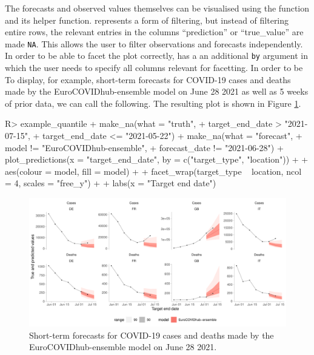 \documentclass[
]{jss}
\begin{document}
The forecasts and observed values themselves can be visualised using the
 function and its  helper
function.  represents a form of filtering, but instead
of filtering entire rows, the relevant entries in the columns
``prediction'' or ``true\_value'' are made \texttt{NA}. This allows the
user to filter observations and forecasts independently. In order to be
able to facet the plot correctly,  has a an
additional \texttt{by} argument in which the user needs to specify all
columns relevant for facetting. In order to be To display, for example,
short-term forecasts for COVID-19 cases and deaths made by the
EuroCOVIDhub-ensemble model on June 28 2021 as well as 5 weeks of prior
data, we can call the following. The resulting plot is shown in Figure
\ref{fig:forecast-visualisation}.

\begin{CodeChunk}
\begin{CodeInput}
R> example_quantile %
+   make_na(what = "truth", 
+           target_end_date > "2021-07-15",
+           target_end_date <= "2021-05-22") %
+   make_na(what = "forecast", 
+           model != "EuroCOVIDhub-ensemble",
+           forecast_date != "2021-06-28") %
+   plot_predictions(x = "target_end_date", by = c("target_type", "location")) +
+   aes(colour = model, fill = model) +
+   facet_wrap(target_type ~ location, ncol = 4, scales = "free_y") +
+   labs(x = "Target end date")
\end{CodeInput}
\begin{figure}[!h]

{\centering \includegraphics[width=1\linewidth]{manuscript_files/figure-latex/forecast-visualisation-1} 

}

\caption[Short-term forecasts for COVID-19 cases and deaths made by the EuroCOVIDhub-ensemble model on June 28 2021]{Short-term forecasts for COVID-19 cases and deaths made by the EuroCOVIDhub-ensemble model on June 28 2021.}\label{fig:forecast-visualisation}
\end{figure}
\end{CodeChunk}
\end{document}
